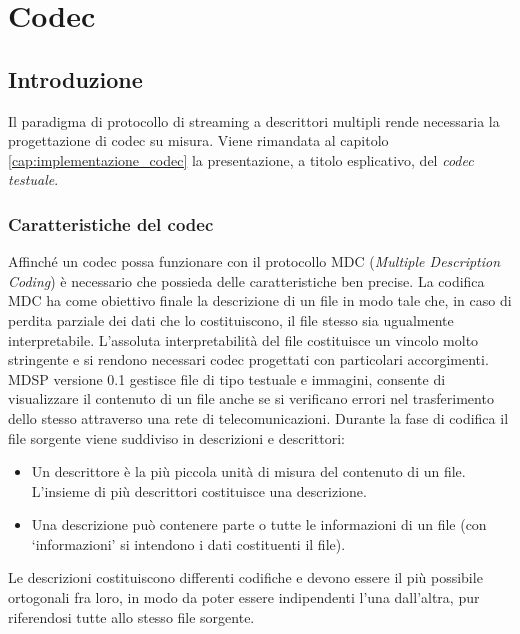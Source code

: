 \chapter{Codec}
\label{cap:codec}
\section{Introduzione}
Il paradigma di protocollo di streaming a descrittori multipli rende
necessaria la progettazione di codec su misura. Viene rimandata al capitolo
\ref{cap:implementazione_codec} la presentazione, a titolo esplicativo, del
\emph{codec testuale}.

\subsection{Caratteristiche del codec}
Affinché un codec possa funzionare con il protocollo MDC (\emph{Multiple
Description Coding}) è necessario che possieda delle caratteristiche ben precise.
La codifica MDC ha come obiettivo finale la descrizione di un file in modo tale
che, in caso di perdita parziale dei dati che lo costituiscono, il file stesso
sia ugualmente interpretabile. L'assoluta interpretabilità del file costituisce
un vincolo molto stringente e si rendono necessari codec progettati con
particolari accorgimenti. MDSP versione 0.1 gestisce file di tipo testuale e
immagini, consente di visualizzare il contenuto di un file anche se si verificano
errori nel trasferimento dello stesso attraverso una rete di telecomunicazioni.
Durante la fase di codifica il file sorgente viene suddiviso in descrizioni e
descrittori:
\begin{itemize}
 \item Un descrittore è la più piccola unità di misura del contenuto di un
 file. L'insieme di più descrittori costituisce una descrizione.
 \item Una descrizione può contenere parte o tutte le informazioni di un file
 (con `informazioni' si intendono i dati costituenti il file).
\end{itemize}
Le descrizioni costituiscono differenti codifiche e devono essere il più possibile ortogonali fra loro, in modo da poter essere indipendenti l'una dall'altra, pur riferendosi tutte allo stesso file sorgente.

